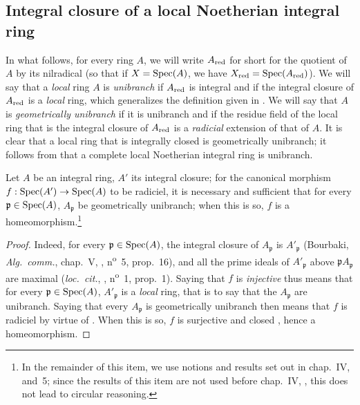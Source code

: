 \subsection{Integral closure of a local Noetherian integral ring}
\label{subsection:0.23.2}

\begin{env}[23.2.1]
\label{0.23.2.1}
In what follows, for every ring $A$, we will write $A_{\mathrm{red}}$ for short for the quotient of $A$ by its nilradical (so that if $X=\operatorname{Spec}(A)$, we have $X_{\mathrm{red}}=\operatorname{Spec}(A_{\mathrm{red}})$).
We will say that a \emph{local} ring $A$ is \emph{unibranch} if $A_{\mathrm{red}}$ is integral and if the integral closure of $A_{\mathrm{red}}$ is a \emph{local} ring, which generalizes the definition given in .
We will say that $A$ is \emph{geometrically unibranch} if it is unibranch and if the residue field of the local ring that is the integral closure of $A_{\mathrm{red}}$ is a \emph{radicial} extension of that of $A$.
It is clear that a local ring that is integrally closed is geometrically unibranch; it follows from  that a complete local Noetherian integral ring is unibranch.
\end{env}

\begin{lemma}[23.2.2]
\label{0.23.2.2}
Let $A$ be an integral ring, $A'$ its integral closure; for the canonical morphism $f:\operatorname{Spec}(A')\to\operatorname{Spec}(A)$ to be radiciel, it is necessary and sufficient that for every $\mathfrak{p}\in\operatorname{Spec}(A)$, $A_\mathfrak{p}$ be geometrically unibranch; when this is so, $f$ is a homeomorphism.\footnote{In the remainder of this item, we use notions and results set out in chap.~IV, \textsection{} and~5; since the results of this item are not used before chap.~IV, , this does not lead to circular reasoning.}
\end{lemma}

\begin{proof}
Indeed, for every $\mathfrak{p}\in\operatorname{Spec}(A)$, the integral closure of $A_\mathfrak{p}$ is $A'_\mathfrak{p}$ (Bourbaki, \emph{Alg.~comm.}, chap.~V, , n\textsuperscript{o}~5, prop.~16), and all the prime ideals of $A'_\mathfrak{p}$ above $\mathfrak{p}A_\mathfrak{p}$ are maximal (\emph{loc.~cit.}, , n\textsuperscript{o}~1, prop.~1).
Saying that $f$ is \emph{injective} thus means that for every $\mathfrak{p}\in\operatorname{Spec}(A)$, $A'_\mathfrak{p}$ is a \emph{local} ring, that is to say that the $A_\mathfrak{p}$ are unibranch.
Saying that every $A_\mathfrak{p}$ is geometrically unibranch then means that $f$ is radiciel by virtue of .
When this is so, $f$ is surjective and closed , hence a homeomorphism.
\end{proof}

